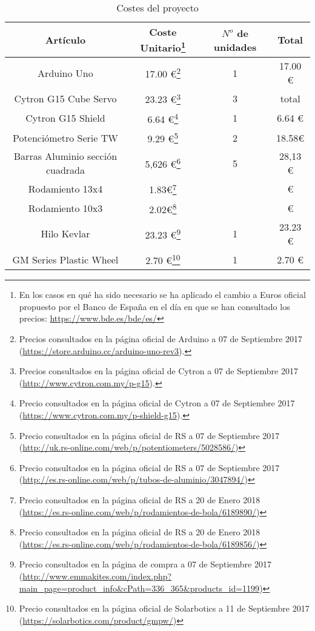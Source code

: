     \begin{table}[H]
    \caption{Costes del proyecto}
    \label{tab:presupuesto}
    \begin{center}
    \begin{minipage}{\textwidth}
    \begin{tabular}{ |c|c|c|c| }
    \hline
    Artículo & Coste Unitario\footnote{En los casos en qué ha sido necesario se ha aplicado el cambio a Euros oficial propuesto por el Banco de España en el día en que se han consultado los precios: \url{https://www.bde.es/bde/es/}} & $N^o$ de unidades & Total\\
    \hline
    \hline
    Arduino Uno & 17.00 \euro\footnote{Precios consultados en la página oficial de Arduino a 07 de Septiembre 2017 (\url{https://store.arduino.cc/arduino-uno-rev3}).} & 1 & 17.00 \euro\\
    Cytron G15 Cube Servo & 23.23 \euro\footnote{Precios consultados en la página oficial de Cytron a 07 de Septiembre 2017 (\url{http://www.cytron.com.my/p-g15}).} & 3 & total\\
    Cytron G15 Shield & 6.64 \euro\footnote{Precio consultados en la página oficial de Cytron a 07 de Septiembre 2017 (\url{https://www.cytron.com.my/p-shield-g15}).} & 1 & 6.64 \euro\\
    \hline
    \hline
    Potenciómetro Serie TW & 9.29 \euro\footnote{Precio consultados en la página oficial de RS a 07 de Septiembre 2017 (\url{http://uk.rs-online.com/web/p/potentiometers/5028586/})} & 2 & 18.58\euro \\
    \hline
    \hline
    Barras Aluminio sección cuadrada & 5,626 \euro\footnote{Precio consultados en la página oficial de RS a 07 de Septiembre 2017 (\url{http://es.rs-online.com/web/p/tubos-de-aluminio/3047894/})} & 5 & 28,13 \euro \\
    Rodamiento 13x4 & 1.83\euro\footnote{Precio consultados en la página oficial de RS a 20 de Enero 2018 (\url{https://es.rs-online.com/web/p/rodamientos-de-bola/6189890/})} & & \euro \\
    Rodamiento 10x3 & 2.02\euro\footnote{Precio consultados en la página oficial de RS a 20 de Enero 2018 (\url{https://es.rs-online.com/web/p/rodamientos-de-bola/6189856/})} & & \euro \\
    Hilo Kevlar & 23.23 \euro\footnote{Precio consultados en la página de compra a 07 de Septiembre 2017 (\url{http://www.emmakites.com/index.php?main_page=product_info&cPath=336_365&products_id=1199})} & 1 & 23.23 \euro \\
    GM Series Plastic Wheel & 2.70 \euro\footnote{Precio consultados en la página oficial de Solarbotics a 11 de Septiembre 2017 (\url{https://solarbotics.com/product/gmpw/})} & 1 & 2.70 \euro \\
    \hline
    \end{tabular}
    \end{minipage}
    \end{center}
    \end{table}

